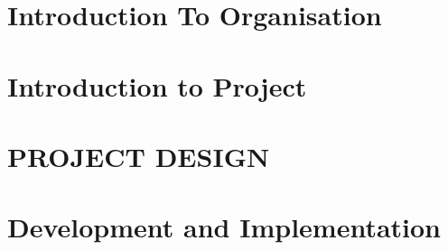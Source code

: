 \documentclass[12pt,includeheadfoot,a4paper]{report}
\begin{document}


\thispagestyle{empty}
\pagetitle
\newpage
{}
\cfoot{\thepage}



\newpage


\newpage
\tableofcontents
\newpage
\listoffigures
\newpage
\listoftables
\newpage


\cfoot{\thepage}


\newpage

\chapter{Introduction To Organisation}


\newpage

\chapter{Introduction to Project}



\chapter{PROJECT DESIGN}












%
%
%


%

\chapter{Development and Implementation}


%


%


%
%
%
%
\end{document}
